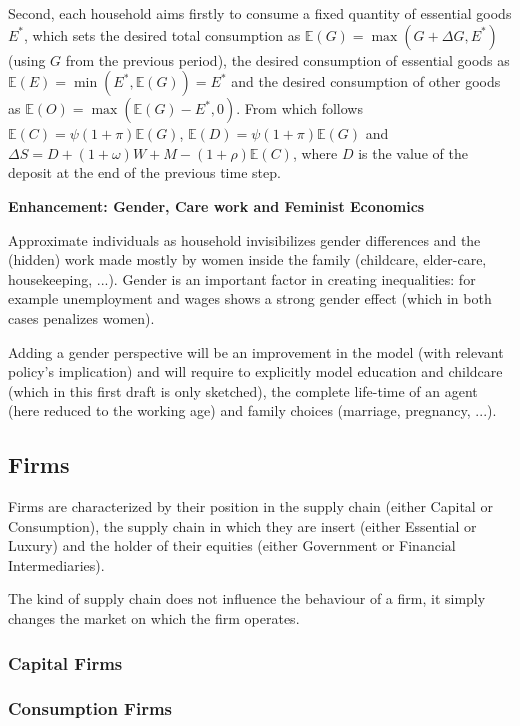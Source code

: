 \documentclass[a4paper, headings=standardclasses]{scrartcl}
\newenvironment{enh}[1][]{\begin{framed}\noindent\textbf{Enhancement: #1}\par}{\end{framed}}
\begin{document}
Second, each household aims firstly to consume a fixed quantity of essential goods $E^*$, which sets the desired total consumption as $\mathbb{E}(G) = \max(G + \Delta G, E^*)$ (using $G$ from the previous period), the desired consumption of essential goods as $\mathbb{E}(E) = \min(E^*, \mathbb{E}(G)) = E^*$ and the desired consumption of other goods as $\mathbb{E}(O) = \max(\mathbb{E}(G) - E^*, 0)$. From which follows $\mathbb{E}(C) = \psi (1+\pi) \mathbb{E}(G)$, $\mathbb{E}(D) = \psi (1+\pi) \mathbb{E}(G)$ and $\Delta S = D + (1+\omega) W + M - (1+\rho) \mathbb{E}(C)$, where $D$ is the value of the deposit at the end of the previous time step.

\begin{enh}[Gender, Care work and Feminist Economics]
	Approximate individuals as household invisibilizes gender differences and the (hidden) work made mostly by women inside the family (childcare, elder-care, housekeeping, ...).
	Gender is an important factor in creating inequalities: for example unemployment and wages shows a strong gender effect (which in both cases penalizes women).

	Adding a gender perspective will be an improvement in the model (with relevant policy's implication) and will require to explicitly model education and childcare (which in this first draft is only sketched), the complete life-time of an agent (here reduced to the working age) and family choices (marriage, pregnancy, ...).
\end{enh}

\subsection{Firms}
Firms are characterized by their position in the supply chain (either Capital or Consumption), the supply chain in which they are insert (either Essential or Luxury) and the holder of their equities (either Government or Financial Intermediaries).

The kind of supply chain does not influence the behaviour of a firm, it simply changes the market on which the firm operates.

\subsubsection{Capital Firms}

\subsubsection{Consumption Firms}
\end{document}
